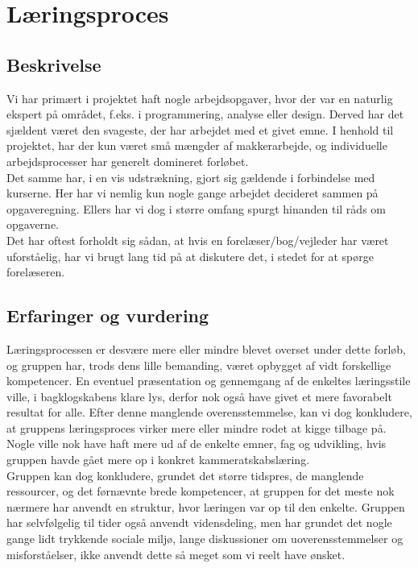 \documentclass[11pt]{article}
\begin{document}
\section{Læringsproces}
\subsection{Beskrivelse}
Vi har primært i projektet haft nogle arbejdsopgaver, hvor der var en naturlig ekspert på området, f.eks. i programmering, analyse eller design. Derved har det sjældent været den svageste, der har arbejdet med et givet emne. 
I henhold til projektet, har der kun været små mængder af makkerarbejde, og individuelle arbejdsprocesser har generelt domineret forløbet.\\ 
Det samme har, i en vis udstrækning, gjort sig gældende i forbindelse med kurserne. Her har vi nemlig kun nogle gange arbejdet decideret sammen på opgaveregning. Ellers har vi dog i større omfang spurgt hinanden til råds om opgaverne.\\
Det har oftest forholdt sig sådan, at hvis en forelæser/bog/vejleder har været uforståelig, har vi brugt lang tid på at diskutere det, i stedet for at spørge forelæseren.

\subsection{Erfaringer og vurdering}
Læringsprocessen er desvære mere eller mindre blevet overset under dette forløb, og gruppen har, trods dens lille bemanding, været opbygget af vidt forskellige kompetencer. En eventuel præsentation og gennemgang af de enkeltes læringsstile ville, i bagklogskabens klare lys, derfor nok også have givet et mere favorabelt resultat for alle. Efter denne manglende overensstemmelse, kan vi dog konkludere, at gruppens læringsproces virker mere eller mindre rodet at kigge tilbage på. Nogle ville nok have haft mere ud af de enkelte emner, fag og udvikling, hvis gruppen havde gået mere op i konkret kammeratskabslæring.\\
Gruppen kan dog konkludere, grundet det større tidspres, de manglende ressourcer, og det førnævnte brede kompetencer, at gruppen for det meste nok nærmere har anvendt en struktur, hvor læringen var op til den enkelte. Gruppen har selvfølgelig til tider også anvendt vidensdeling, men har grundet det nogle gange lidt trykkende sociale miljø, lange diskussioner om uoverensstemmelser og misforståelser, ikke anvendt dette så meget som vi reelt have ønsket.
\end{document}
